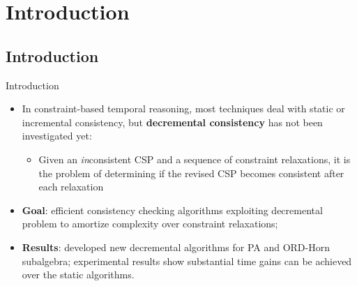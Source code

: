 \section{Introduction}

\subsection{Introduction}
\begin{frame}{Introduction}
	\begin{itemize}
		\item In constraint-based temporal reasoning, most techniques deal with static or incremental consistency, but \textbf{decremental consistency} has not been investigated yet:
		\begin{itemize}
			\item Given an \textit{in}consistent CSP and a sequence of constraint relaxations, it is the problem of determining if the revised CSP becomes consistent after each relaxation
		\end{itemize}
		
		\item \textbf{Goal}: efficient consistency checking algorithms exploiting decremental problem to amortize complexity over constraint relaxations;
		
		\item \textbf{Results}: developed new decremental algorithms for PA and ORD-Horn subalgebra; experimental results show substantial time gains can be achieved over the static algorithms.
	\end{itemize}
\end{frame}

